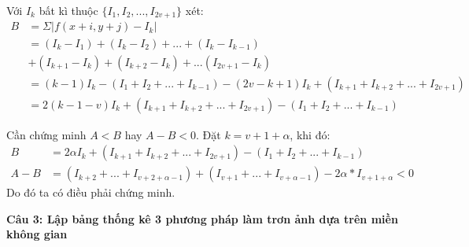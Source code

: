 Với $I_k$ bất kì thuộc $\{I_1, I_2, ..., I_{2v+1}\}$ xét:
\begin{align*}
	B &= \Sigma |f(x+i,y+j) - I_k| \\
	&= (I_k - I_1) + (I_k - I_2) + ... + (I_k - I_{k-1}) \\ 
	&+ (I_{k+1} - I_k) + (I_{k+2} - I_k) + ... (I_{2v+1} - I_k) \\
	&= (k - 1)I_k - (I_1 + I_2 + ... + I_{k-1}) - (2v - k + 1)I_k + (I_{k+1} + I_{k+2} + ... + I_{2v+1}) \\
	&= 2(k - 1 - v)I_k + (I_{k+1} + I_{k+2} + ... + I_{2v+1}) - (I_1 + I_2 + ... + I_{k-1})
\end{align*}

Cần chứng minh $A < B$ hay $A - B < 0$. Đặt $k = v + 1 + \alpha$, khi đó:
\begin{align*}
	B &= 2 \alpha I_k + (I_{k+1} + I_{k+2} + ... + I_{2v+1}) - (I_1 + I_2 + ... + I_{k-1}) \\
	A - B &= (I_{k+2} + ... + I_{v+2+\alpha - 1}) + (I_{v+1} + ... + I_{v+ \alpha - 1}) - 2 \alpha * I_{v + 1 + \alpha} < 0
\end{align*}
Do đó ta có điều phải chứng minh.

\textbf{Câu 3: Lập bảng thống kê 3 phương pháp làm trơn ảnh dựa trên miền không gian}

